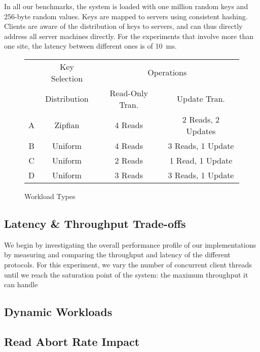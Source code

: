 In all our benchmarks, the system is loaded with one million random keys and 256-byte random values. Keys are mapped to servers using consistent hashing. Clients are aware of the distribution of keys to servers, and can thus directly address all server machines directly. For the experiments that involve more than one site, the latency between different ones is of 10~ms.

\begin{figure}[h]
\begin{center}
\begin{tabularx}{0.75\linewidth}{c|c|c|c}
    & Key Selection
    & \multicolumn{2}{c}{Operations} \\
    & Distribution
    & Read-Only Tran.
    & Update Tran. \\ \hline
    A & Zipfian & 4 Reads & 2 Reads, 2 Updates \\
    B & Uniform & 4 Reads & 3 Reads, 1 Update \\
    C & Uniform & 2 Reads & 1 Read, 1 Update \\
    D & Uniform & 3 Reads & 3 Reads, 1 Update \\
\end{tabularx}
\end{center}
\caption{Workload Types }
\label{fig:workload-types}
\end{figure}


\subsection{Latency \& Throughput Trade-offs}

We begin by investigating the overall performance profile of our implementations by measuring and comparing the throughput and latency of the different protocols. For this experiment, we vary the number of concurrent client threads until we reach the saturation point of the system: the maximum throughput it can handle

\subsection{Dynamic Workloads}

\subsection{Read Abort Rate Impact}

